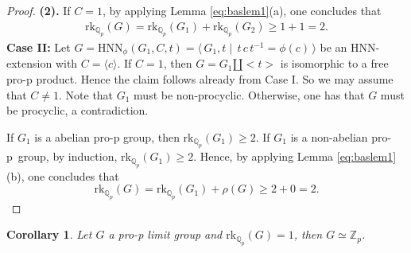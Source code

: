 \documentclass[10pt]{amsart}
\theoremstyle{plain}
\newtheorem{cor}[prop]{Corollary}
\theoremstyle{definition}
\theoremstyle{remark}
\numberwithin{prop}{section}
\numberwithin{example}{section}
\numberwithin{equation}{section}
\newcommand{\Z}{\mathbb{Z}}
\newcommand{\Q}{\mathbb{Q}}
\newcommand{\rk}{\mathrm{rk}}
\newcommand{\HNN}{\mathrm{HNN}}
\begin{document}
\begin{proof}
	\noindent
	{\bf (2).} If $C=1$, by applying Lemma \ref{eq:baslem1}(a), one concludes that  
	\begin{align}
		\rk_{\Q_p}(G)=\rk_{\Q_p}(G_1)+\rk_{\Q_p}(G_2)\geq 1+1=2.	
	\end{align}
	{\bf Case II:} Let  $G=\HNN_\phi(G_1,C,t)=
	\langle\, G_1,t\mid\,t\,c\,t^{-1}=\phi(c)\,\rangle$ be an HNN-extension
	with   $C=\langle c \rangle$. If $C=1$, then $G=G_1\amalg <t>$ is isomorphic to a free pro-p  product.
	Hence the claim follows already from Case I. So we may assume that $C\not=1$. Note that $G_1$ must be non-procyclic.
	Otherwise, one has that  $G$ must be procyclic, a contradiction. 
	
	If $G_1$ is a  abelian pro-p group, then $\rk_{\Q_p}(G_1)\geq 2$.  If $G_1$ is a  non-abelian pro-p~group, by induction, $\rk_{\Q_p}(G_1)\geq 2$. Hence,
	by applying Lemma \ref{eq:baslem1}(b), one concludes that 
	\begin{equation}
	\rk_{\Q_p}(G)=\rk_{\Q_p}(G_1)+\rho(G)\geq 2+0=2.
	\end{equation}
	
	
\end{proof}




\begin{cor}
	Let $G$ a pro-p limit  group  and  $\rk_{\Q_p}(G)=1$, then   $G\simeq \Z_p$. 
\end{cor} 
	
	
	
\end{document}

